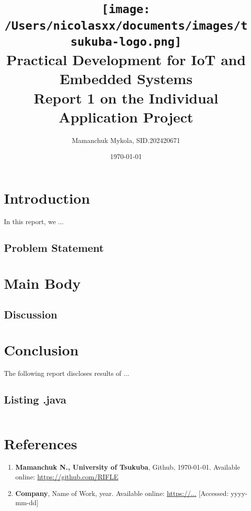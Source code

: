 \documentclass[12pt,a4paper]{article}
\title{
    \texttt{[image: /Users/nicolasxx/documents/images/tsukuba-logo.png]} \\
    \textbf{Practical Development for IoT and Embedded Systems} \\
    \vspace{3mm}    
    Report 1 on the Individual Application Project
}
\author{Mamanchuk Mykola, SID.202420671}
\date{\today}
\begin{document}
\maketitle

\section{Introduction}
In this report, we ...

\subsection{Problem Statement}

\section{Main Body}

\subsection{Discussion}

\setlength{\fboxsep}{0pt} %
\setlength{\fboxrule}{0.5pt} %

\section{Conclusion}
The following report discloses results of ...


\subsection*{Listing .java}
\begin{lstlisting}

\end{lstlisting}

\section*{References}
\begin{enumerate}
    \item \textbf{Mamanchuk N., University of Tsukuba}, Github, \today. Available online: \url{https://github.com/RIFLE}
    \item \textbf{Company}, Name of Work, year. Available online: \url{https://...} [Accessed: yyyy-mm-dd]
\end{enumerate}
\end{document}
